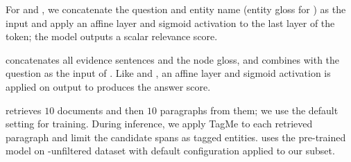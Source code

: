 For \bertet{} and \bertsent{}, we concatenate the question and entity
name (entity gloss for \bertsent{}) as the \bert{} input and
 apply an affine layer and sigmoid activation to the last \bert{} layer of the \abr{[cls]} token; the model
outputs a scalar relevance score.


\memnn{} concatenates all evidence sentences and the node gloss, and combines with the question
as the input of \bert{}.  Like \bertet{} and \bertsent{}, an affine layer and sigmoid activation is
applied on \bert{} output to produces the answer score.


\drqa{} retrieves $10$ documents and then $10$ paragraphs from them; we use the default 
setting for training. During inference, we apply TagMe to 
each retrieved paragraph and 
limit the candidate spans as tagged entities. 
\docqa{} uses the pre-trained model on \triviaqa{}-unfiltered
dataset with default configuration applied to our subset.
